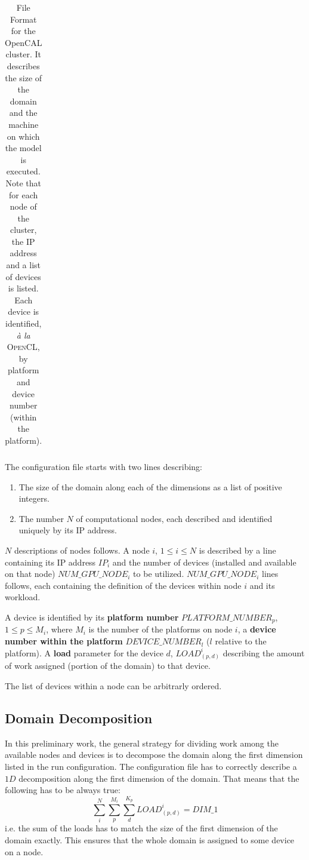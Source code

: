 \begin{table}
\begin{tabular}{m{0.21\linewidth}| m{0.7\linewidth}}
\end{tabular}
\caption{File Format for  the OpenCAL cluster. It describes the size of the domain and the machine on which the model is executed. Note that for each node of the cluster, the IP address and a list of devices is listed. Each device is identified, \textit{\`a la} \textsc{OpenCL}, by platform and device number (within the platform).}
\label{code:file_syntax}
\end{table}
\captionsetup[table]{name=Table}

The configuration file starts with two lines describing:
\begin{enumerate}
	\item The size of the domain along each of the dimensions as a list of positive integers.
	\item The number $N$ of computational nodes, each described and identified uniquely by its IP address.
\end{enumerate}
$N$ descriptions of nodes follows.
A node $i$, $1 \leq i \leq N$ is described by a line containing its IP address $IP_i$ and the number of devices (installed and available on that node) $NUM\_GPU\_NODE_i$ to be utilized.
$NUM\_GPU\_NODE_i$ lines follows, each containing the definition of the devices within node $i$ and its workload. 

A device is identified by its \textbf{platform number} $PLATFORM\_NUMBER_p$, $1 \leq p \leq M_i$, where $M_i$ is the number of the platforms on node $i$, a \textbf{device number within the platform} $DEVICE\_NUMBER_l$ ($l$ relative to the platform). A \textbf{load} parameter for the device $d$, $LOAD^i_{(p,d)}$ describing the amount of work assigned (portion of the domain) to that device.

The list of devices within a node can be arbitrarly ordered.



\subsection{Domain Decomposition}
\label{sec:domain_decomposition}
In this preliminary work, the general strategy for dividing work among the available nodes and devices is to decompose the domain along the first dimension listed in the run configuration. The configuration file has to correctly describe a $1D$ decomposition along the first dimension of the domain. That means that the following has to be always true:
\[
\sum_i^N \sum_p^{M_i} \sum_d^{K_p} LOAD^i_{(p,d)} = DIM\_1
\]
i.e. the sum of the loads has to  match the size of the first dimension of the domain exactly. This ensures that the whole domain is assigned to some device on a node.

